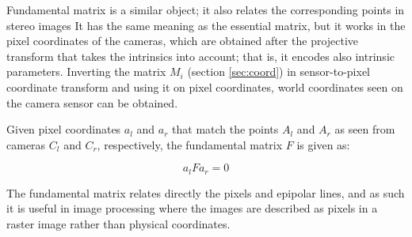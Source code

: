 %
%

Fundamental matrix is a similar object; it also relates the corresponding points in stereo images
It has the same meaning as the essential matrix, but it works in the pixel coordinates of the cameras, which are obtained after the projective transform that takes the intrinsics into account; that is, it encodes also intrinsic parameters.
Inverting the matrix $M_i$ (section \ref{sec:coord}) in sensor-to-pixel coordinate transform and using it on pixel coordinates, world coordinates seen on the camera sensor can be obtained. %

Given pixel coordinates $a_l$ and $a_r$ that match the points $A_l$ and $A_r$ as seen from cameras $C_l$ and $C_r$, respectively, the fundamental matrix $F$ is given as:

\begin{equation} \label{eq:fundamental}
	a_l F a_r = 0
\end{equation}


%
%
%
%

The fundamental matrix relates directly the pixels and epipolar lines, and as such it is useful in image processing where the images are described as pixels in a raster image rather than physical coordinates.

